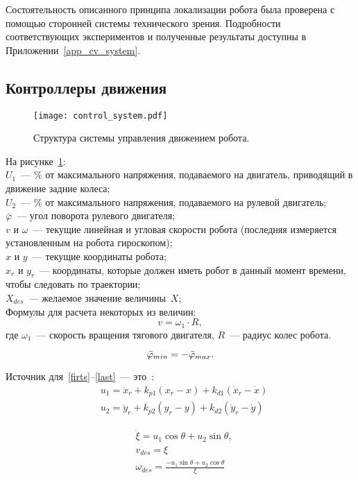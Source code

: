 Состоятельность описанного принципа локализации робота была проверена с помощью сторонней системы технического зрения.
Подробности соответствующих экспериментов и полученные результаты доступны в Приложении~\ref{app_cv_system}.



\subsection{Контроллеры движения}
\begin{figure}[h]
    \centering
    \texttt{[image: control\_system.pdf]}
    \caption{Структура системы управления движением робота.}
    \label{img_control_system}
\end{figure}
На рисунке~\ref{img_control_system}:\\
$U_1$~--- \% от максимального напряжения, подаваемого на двигатель, приводящий в движение задние колеса;\\
$U_2$~--- \% от максимального напряжения, подаваемого на рулевой двигатель;\\
$\bar\varphi$~--- угол поворота рулевого двигателя;\\
$v$ и $\omega$~--- текущие линейная и угловая скорости робота (последняя измеряется установленным на робота гироскопом);\\
$x$ и $y$~--- текущие координаты робота;\\
$x_r$ и $y_r$~--- координаты, которые должен иметь робот в данный момент времени, чтобы следовать по траектории;\\
$X_{des}$~--- желаемое значение величины~$X$;\\

Формулы для расчета некоторых из величин:
\begin{equation}
v = \omega_1 \cdot R,
\end{equation}
где $\omega_1$~--- скорость вращения тягового двигателя, $R$~--- радиус колес робота.

\begin{equation}
\bar{\varphi}_{min} = -\bar{\varphi}_{max}\ldotp
\end{equation}

Источник для~\eqref{firts}--\eqref{last}~--- это~\cite{de_luca}:
\begin{align}
& u_1 = \ddot{x}_r + k_{p1} (x_r - x) + k_{d1} (\dot{x}_r - \dot{x}) \label{firts}\\
& u_2 = \ddot{y}_r + k_{p2} (y_r - y) + k_{d2} (\dot{y}_r - \dot{y})
\end{align}

\begin{align}
& \dot{\xi} = u_1 \cos \theta + u_2 \sin \theta, \\
& v_{des} = \xi \\
& \omega_{des} = \frac{-u_1 \sin \theta + u_2 \cos \theta}{\xi} \label{last}
\end{align}
